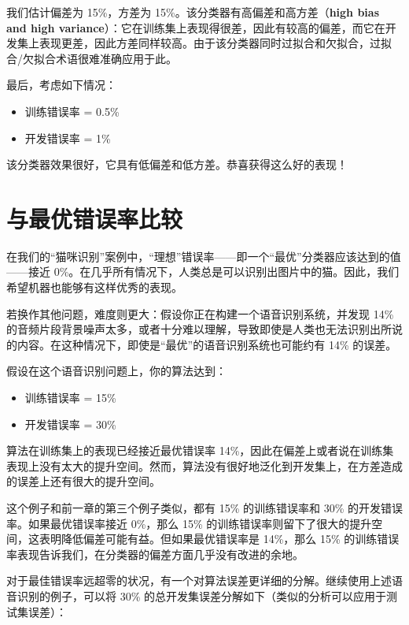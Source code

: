 我们估计偏差为 15\%，方差为 15\%。该分类器有高偏差和高方差（\textbf{high
bias and high
variance}）：它在训练集上表现得很差，因此有较高的偏差，而它在开发集上表现更差，因此方差同样较高。由于该分类器同时过拟合和欠拟合，过拟合/欠拟合术语很难准确应用于此。

最后，考虑如下情况：

\begin{itemize}
\tightlist
\item
  训练错误率 = 0.5\%
\item
  开发错误率 = 1\%
\end{itemize}

该分类器效果很好，它具有低偏差和低方差。恭喜获得这么好的表现！

\hypertarget{ux4e0eux6700ux4f18ux9519ux8befux7387ux6bd4ux8f83}{%
\chapter{与最优错误率比较}\label{ux4e0eux6700ux4f18ux9519ux8befux7387ux6bd4ux8f83}}

在我们的``猫咪识别''案例中，``理想''错误率------即一个``最优''分类器应该达到的值------接近
0\%。在几乎所有情况下，人类总是可以识别出图片中的猫。因此，我们希望机器也能够有这样优秀的表现。

若换作其他问题，难度则更大：假设你正在构建一个语音识别系统，并发现 14\%
的音频片段背景噪声太多，或者十分难以理解，导致即使是人类也无法识别出所说的内容。在这种情况下，即使是``最优''的语音识别系统也可能约有
14\% 的误差。

假设在这个语音识别问题上，你的算法达到：

\begin{itemize}
\tightlist
\item
  训练错误率 = 15\%
\item
  开发错误率 = 30\%
\end{itemize}

算法在训练集上的表现已经接近最优错误率
14\%，因此在偏差上或者说在训练集表现上没有太大的提升空间。然而，算法没有很好地泛化到开发集上，在方差造成的误差上还有很大的提升空间。

这个例子和前一章的第三个例子类似，都有 15\% 的训练错误率和 30\%
的开发错误率。如果最优错误率接近 0\%，那么 15\%
的训练错误率则留下了很大的提升空间，这表明降低偏差可能有益。但如果最优错误率是
14\%，那么 15\%
的训练错误率表现告诉我们，在分类器的偏差方面几乎没有改进的余地。

对于最佳错误率远超零的状况，有一个对算法误差更详细的分解。继续使用上述语音识别的例子，可以将
30\% 的总开发集误差分解如下（类似的分析可以应用于测试集误差）：

